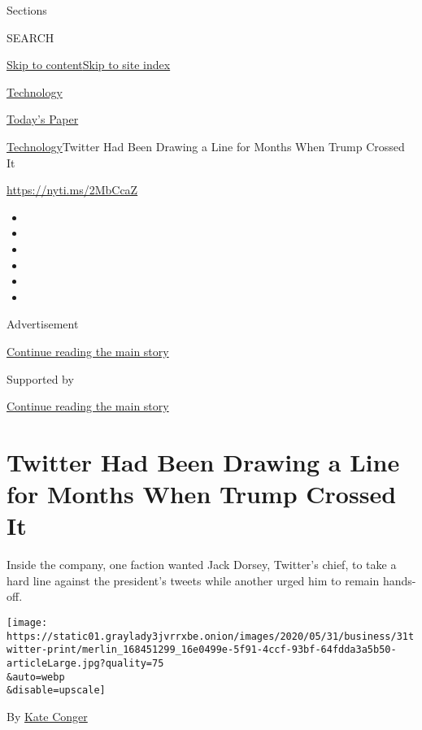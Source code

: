 Sections

SEARCH

\protect\hyperlink{site-content}{Skip to
content}\protect\hyperlink{site-index}{Skip to site index}

\href{https://www.nytimes3xbfgragh.onion/section/technology}{Technology}

\href{https://myaccount.nytimes3xbfgragh.onion/auth/login?response_type=cookie\&client_id=vi}{}

\href{https://www.nytimes3xbfgragh.onion/section/todayspaper}{Today's
Paper}

\href{/section/technology}{Technology}\textbar{}Twitter Had Been Drawing
a Line for Months When Trump Crossed It

\href{https://nyti.ms/2MbCcaZ}{https://nyti.ms/2MbCcaZ}

\begin{itemize}
\item
\item
\item
\item
\item
\item
\end{itemize}

Advertisement

\protect\hyperlink{after-top}{Continue reading the main story}

Supported by

\protect\hyperlink{after-sponsor}{Continue reading the main story}

\hypertarget{twitter-had-been-drawing-a-line-for-months-when-trump-crossed-it}{%
\section{Twitter Had Been Drawing a Line for Months When Trump Crossed
It}\label{twitter-had-been-drawing-a-line-for-months-when-trump-crossed-it}}

Inside the company, one faction wanted Jack Dorsey, Twitter's chief, to
take a hard line against the president's tweets while another urged him
to remain hands-off.

\texttt{[image: https://static01.graylady3jvrrxbe.onion/images/2020/05/31/business/31twitter-print/merlin\_168451299\_16e0499e-5f91-4ccf-93bf-64fdda3a5b50-articleLarge.jpg?quality=75\\\&auto=webp\\\&disable=upscale]}

By \href{https://www.nytimes3xbfgragh.onion/by/kate-conger}{Kate Conger}

